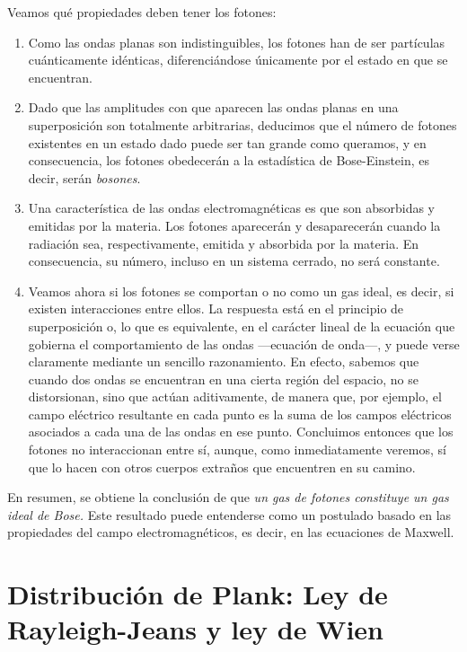 Veamos qué propiedades deben tener los fotones:
\begin{enumerate}
	\item Como las ondas planas son indistinguibles, los fotones han de ser partículas cuánticamente idénticas, diferenciándose únicamente por el estado en que se encuentran.
	
	\item Dado que las amplitudes con que aparecen las ondas planas en una superposición son totalmente arbitrarias, deducimos que el número de fotones existentes en un estado dado puede ser tan grande como queramos, y en consecuencia, los fotones obedecerán a la estadística de Bose-Einstein, es decir, serán \emph{bosones}.
	
	\item Una característica de las ondas electromagnéticas es que son absorbidas y emitidas por la materia.
	Los fotones aparecerán y desaparecerán cuando la radiación sea, respectivamente, emitida y absorbida por la materia.
	En consecuencia, su número, incluso en un sistema cerrado, no será constante.
	
	\item Veamos ahora si los fotones se comportan o no como un gas ideal, es decir, si existen interacciones entre ellos.
	La respuesta está en el principio de superposición o, lo que es equivalente, en el carácter lineal de la ecuación que gobierna el comportamiento de las ondas ---ecuación de onda---, y puede verse claramente mediante un sencillo razonamiento.
	En efecto, sabemos que cuando dos ondas se encuentran en una cierta región del espacio, no se distorsionan, sino que actúan aditivamente, de manera que, por ejemplo, el campo eléctrico resultante en cada punto es la suma de los campos 	eléctricos asociados a cada una de las ondas en ese punto.
	Concluimos entonces que los fotones no interaccionan entre sí, aunque, como inmediatamente veremos, sí que lo hacen con otros cuerpos extraños que encuentren en su camino.
\end{enumerate}

En resumen, se obtiene la conclusión de que \emph{un gas de fotones constituye un gas ideal de Bose.}
Este resultado puede entenderse como un postulado basado en las propiedades del campo electromagnéticos, es decir, en las ecuaciones de Maxwell.

\section{Distribución de Plank: Ley de Rayleigh-Jeans y ley de Wien}
